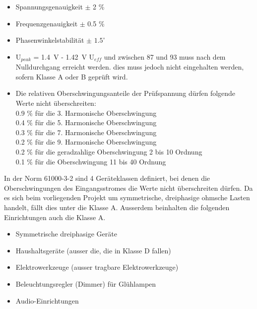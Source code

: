 \begin{appendix}
\begin{itemize}
	\item Spannungsgenauigkeit $\pm$ 2 \%
	\item Frequenzgenauigkeit $\pm$ 0.5 \%
	\item Phasenwinkelstabilität $\pm$ $1.5^\circ$
	\item 	U$_{peak}$ = \SI{1.4}{V} - \SI{1.42}{V} U$_{eff}$ und zwischen 87\textdegree \hspace{0.02cm} und 93\textdegree \hspace{0.02cm} muss nach dem Nulldurchgang erreicht werden. dies muss jedoch nicht eingehalten werden, sofern Klasse A oder B geprüft wird.
	\item Die relativen Oberschwingungsanteile der Prüfspannung dürfen folgende Werte nicht überschreiten:\\
	0.9 \% für die 3. Harmonische Oberschwingung\\
	0.4 \% für die 5. Harmonische Oberschwingung\\
	0.3 \% für die 7. Harmonische Oberschwingung\\
	0.2 \% für die 9. Harmonische Oberschwingung\\
	0.2 \% für die geradzahlige Oberschwingung 2 bis 10 Ordnung\\
	0.1 \% für die Oberschwingung 11 bis 40 Ordnung\\
\end{itemize} 

In der Norm 61000-3-2 sind 4 Geräteklassen definiert, bei denen die Oberschwingungen des Eingangsstromes die Werte nicht überschreiten dürfen. Da es sich beim vorliegenden Projekt um symmetrische, dreiphasige ohmsche Lasten handelt, fällt dies unter die Klasse A. Ausserdem beinhalten die folgenden Einrichtungen auch die Klasse A. 
\begin{itemize}
	\item Symmetrische dreiphasige Geräte	
	\item Haushaltsgeräte (ausser die, die in Klasse D fallen)
	\item Elektrowerkzeuge (ausser tragbare Elektrowerkzeuge)
	\item Beleuchtungsregler (Dimmer) für Glühlampen
	\item Audio-Einrichtungen
\end{itemize} 


\end{appendix}
